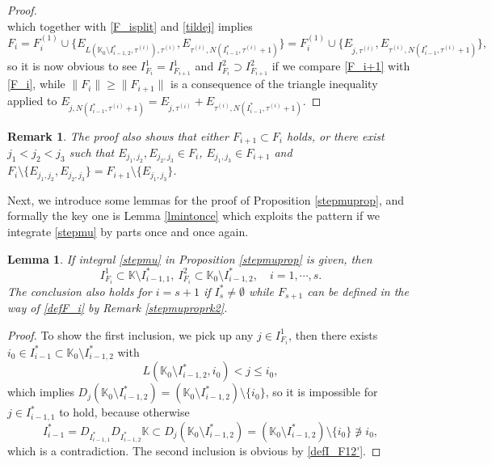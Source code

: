 \documentclass[11pt,reqno]{amsart}
\newtheorem{lemma}[theorem]{Lemma}
\newtheorem{remark}[theorem]{Remark}
\numberwithin{equation}{section}
\theoremstyle{definition}
\begin{document}
\begin{proof}
\begin{equation*}
	\end{equation*}
	which together with \eqref{F_isplit} and \eqref{tildej} implies
	\begin{equation}\label{F_i}
		F_i=F_i^{(1)}\cup\{E_{L(\mathbb{K}_0\setminus I_{i-1,2}^*,\tau^{(i)}),\tau^{(i)}},E_{\tau^{(i)},N(I_{i-1}^*,\tau^{(i)}+1)}\}=F_i^{(1)}\cup\{E_{\tilde{j},\tau^{(i)}},E_{\tau^{(i)},N(I_{i-1}^*,\tau^{(i)}+1)}\},
	\end{equation}
	so it is now obvious to see $I_{F_i}^1=I_{F_{i+1}}^1$ and $I_{F_i}^2\supset I_{F_{i+1}}^2$ if we compare \eqref{F_i+1} with \eqref{F_i}, while $\|F_i\|\geq\|F_{i+1}\|$ is a consequence of the triangle inequality applied to $E_{\tilde{j},N(I_{i-1}^*,\tau^{(i)}+1)}=E_{\tilde{j},\tau^{(i)}}+E_{\tau^{(i)},N(I_{i-1}^*,\tau^{(i)}+1)}$.
\end{proof}

\begin{remark}
	The proof also shows that either $F_{i+1}\subset F_i$ holds, or there exist $j_1<j_2<j_3$ such that $E_{j_1,j_2},E_{j_2,j_3}\in F_i$, $E_{j_1,j_3}\in F_{i+1}$ and $F_i\setminus\{E_{j_1,j_2},E_{j_2,j_3}\}=F_{i+1}\setminus\{E_{j_1,j_3}\}$.
\end{remark}

Next, we introduce some lemmas for the proof of Proposition \ref{stepmuprop}, and formally the key one is Lemma \ref{lmintonce} which exploits the pattern if we integrate \eqref{stepmu} by parts once and once again.

\begin{lemma}\label{lmI_FI^*}
	If integral \eqref{stepmu} in Proposition \ref{stepmuprop} is given, then
	\begin{equation*}
		I_{F_i}^1\subset\mathbb{K}\setminus I_{i-1,1}^*,~I_{F_i}^2\subset\mathbb{K}_0\setminus I_{i-1,2}^*,\quad i=1,\cdots,s.
	\end{equation*}
	The conclusion also holds for $i=s+1$ if $I_s^*\neq\emptyset$ while $F_{s+1}$ can be defined in the way of \eqref{defF_i} by Remark \ref{stepmuproprk2}.
\end{lemma}

\begin{proof}
	To show the first inclusion, we pick up any $j\in I_{F_i}^1$, then there exists $i_0\in I_{i-1}^*\subset\mathbb{K}_0\setminus I_{i-1,2}^*$ with
	\begin{equation*}
		L(\mathbb{K}_0\setminus I_{i-1,2}^*,i_0)<j\leq i_0,
	\end{equation*}
	which implies $D_j(\mathbb{K}_0\setminus I_{i-1,2}^*)=(\mathbb{K}_0\setminus I_{i-1,2}^*)\setminus\{i_0\}$, so it is impossible for $j\in I_{i-1,1}^*$ to hold, because otherwise
	\begin{equation*}
		I_{i-1}^*=D_{I_{i-1,1}^*}D_{I_{i-1,2}^*}\mathbb{K}\subset D_j(\mathbb{K}_0\setminus I_{i-1,2}^*)=(\mathbb{K}_0\setminus I_{i-1,2}^*)\setminus\{i_0\}\notni i_0,
	\end{equation*}
	which is a contradiction. The second inclusion is obvious by \eqref{defI_F12'}.
\end{proof}
\end{document}
